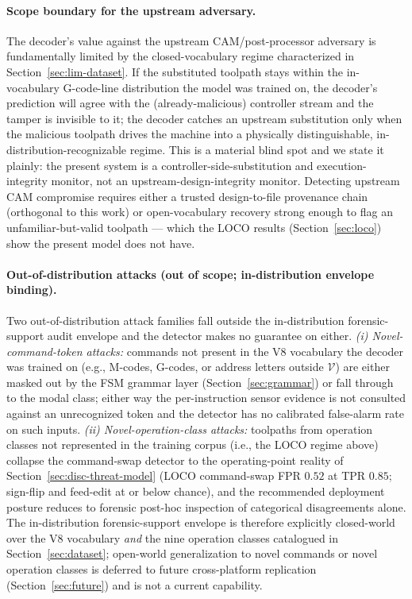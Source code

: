 \documentclass[11pt,a4paper]{article}
\begin{document}
\paragraph{Scope boundary for the upstream adversary.} The decoder's value against the upstream CAM/post-processor adversary is fundamentally limited by the closed-vocabulary regime characterized in Section~\ref{sec:lim-dataset}. If the substituted toolpath stays within the in-vocabulary G-code-line distribution the model was trained on, the decoder's prediction will agree with the (already-malicious) controller stream and the tamper is invisible to it; the decoder catches an upstream substitution only when the malicious toolpath drives the machine into a physically distinguishable, in-distribution-recognizable regime. This is a material blind spot and we state it plainly: the present system is a controller-side-substitution and execution-integrity monitor, not an upstream-design-integrity monitor. Detecting upstream CAM compromise requires either a trusted design-to-file provenance chain (orthogonal to this work) or open-vocabulary recovery strong enough to flag an unfamiliar-but-valid toolpath --- which the LOCO results (Section~\ref{sec:loco}) show the present model does not have.

\paragraph{Out-of-distribution attacks (out of scope; in-distribution envelope binding).} Two out-of-distribution attack families fall outside the in-distribution forensic-support audit envelope and the detector makes no guarantee on either. \emph{(i) Novel-command-token attacks:} commands not present in the V8 vocabulary the decoder was trained on (e.g., M-codes, G-codes, or address letters outside $\mathcal{V}$) are either masked out by the FSM grammar layer (Section~\ref{sec:grammar}) or fall through to the modal class; either way the per-instruction sensor evidence is not consulted against an unrecognized token and the detector has no calibrated false-alarm rate on such inputs. \emph{(ii) Novel-operation-class attacks:} toolpaths from operation classes not represented in the training corpus (i.e., the LOCO regime above) collapse the command-swap detector to the operating-point reality of Section~\ref{sec:disc-threat-model} (LOCO command-swap FPR $0.52$ at TPR $0.85$; sign-flip and feed-edit at or below chance), and the recommended deployment posture reduces to forensic post-hoc inspection of categorical disagreements alone. The in-distribution forensic-support envelope is therefore explicitly closed-world over the V8 vocabulary \emph{and} the nine operation classes catalogued in Section~\ref{sec:dataset}; open-world generalization to novel commands or novel operation classes is deferred to future cross-platform replication (Section~\ref{sec:future}) and is not a current capability.
\end{document}
